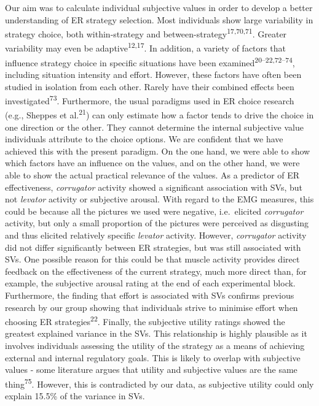 \documentclass[
  man,floatsintext]{apa6}
\begin{document}
Our aim was to calculate individual subjective values in order to develop a better understanding of ER strategy selection.
Most individuals show large variability in strategy choice, both within-strategy and between-strategy\textsuperscript{17,70,71}.
Greater variability may even be adaptive\textsuperscript{12,17}.
In addition, a variety of factors that influence strategy choice in specific situations have been examined\textsuperscript{20--22,72--74}, including situation intensity and effort.
However, these factors have often been studied in isolation from each other.
Rarely have their combined effects been investigated\textsuperscript{73}.
Furthermore, the usual paradigms used in ER choice research (e.g., Sheppes et al.\textsuperscript{21}) can only estimate how a factor tends to drive the choice in one direction or the other.
They cannot determine the internal subjective value individuals attribute to the choice options.
We are confident that we have achieved this with the present paradigm.
On the one hand, we were able to show which factors have an influence on the values, and on the other hand, we were able to show the actual practical relevance of the values.
As a predictor of ER effectiveness, \emph{corrugator} activity showed a significant association with SVs, but not \emph{levator} activity or subjective arousal.
With regard to the EMG measures, this could be because all the pictures we used were negative, i.e.~elicited \emph{corrugator} activity, but only a small proportion of the pictures were perceived as disgusting and thus elicited relatively specific \emph{levator} activity.
However, \emph{corrugator} activity did not differ significantly between ER strategies, but was still associated with SVs.
One possible reason for this could be that muscle activity provides direct feedback on the effectiveness of the current strategy, much more direct than, for example, the subjective arousal rating at the end of each experimental block.
Furthermore, the finding that effort is associated with SVs confirms previous research by our group showing that individuals strive to minimise effort when choosing ER strategies\textsuperscript{22}.
Finally, the subjective utility ratings showed the greatest explained variance in the SVs.
This relationship is highly plausible as it involves individuals assessing the utility of the strategy as a means of achieving external and internal regulatory goals.
This is likely to overlap with subjective values - some literature argues that utility and subjective values are the same thing\textsuperscript{75}.
However, this is contradicted by our data, as subjective utility could only explain 15.5\% of the variance in SVs.
\end{document}

